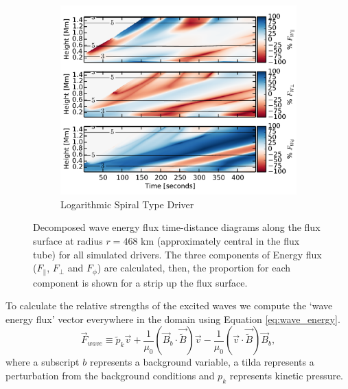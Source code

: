 \begin{figure}
    \begin{subfigure}[b]{0.49\textwidth}
        \includegraphics[width=\columnwidth]{Chapter4/Figs/WaveFlux_TD_Percent_Slog_p240_A10_r30_B005.pdf}
        \caption{Logarithmic Spiral Type Driver}
    \end{subfigure}
    \caption{Decomposed wave energy flux time-distance diagrams along the flux surface at radius $r = 468$ km (approximately central in the flux tube) for all simulated drivers. The three components of Energy flux ($F_\parallel$, $F_\perp$ and $F_\phi$) are calculated, then, the proportion for each component is shown for a strip up the flux surface.}
    \label{fig:All_Flux_percent_TD}
\end{figure}

To calculate the relative strengths of the excited waves we compute the `wave energy flux' vector everywhere in the domain using Equation \ref{eq:wave_energy}.
\begin{equation}
\vec{F}_{wave} \equiv \widetilde{p}_k \vec{v} + \frac{1}{\mu_0} \left(\vec{B}_b \cdot \vec{\widetilde{B}}\right) \vec{v} - \frac{1}{\mu_0}\left(\vec{v} \cdot \vec{\widetilde{B}} \right) \vec{B}_b,
\label{eq:wave_energy2}
\end{equation}
where a subscript $b$ represents a background variable, a tilda represents a perturbation from the background conditions and $p_k$ represents kinetic pressure.

